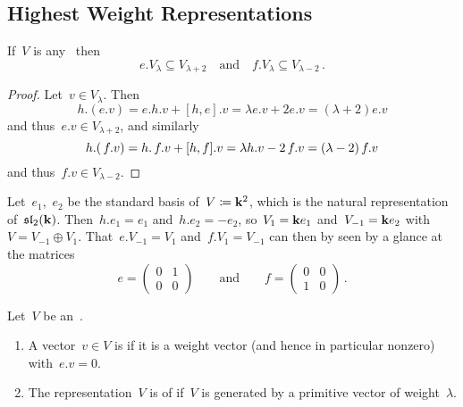 \subsection{Highest Weight Representations}


\begin{lemma}
  \label{shifting lemma}
  If~$V$ is any~{} then
  \[
    e.V_\lambda \subseteq V_{\lambda+2}
    \quad\text{and}\quad
    f.V_\lambda \subseteq V_{\lambda-2} \,.
  \]
\end{lemma}


\begin{proof}
  Let~$v \in V_\lambda$.
  Then
  \[
    h.(e.v)
    =
    e.h.v + [h,e].v
    =
    \lambda e.v + 2e.v
    =
    (\lambda + 2) e.v
  \]
  and thus~$e.v \in V_{\lambda + 2}$, and similarly
  \[
    h.(\, f.v)
    =
    h . \, f . v + [h,f].v
    =
    \lambda h.v - 2 \, f.v
    =
    (\lambda - 2) \, f.v
  \]
  and thus~$f.v \in V_{\lambda - 2}$.
\end{proof}


\begin{example}
  \label{natural representation of sl2}
  Let~$e_1$,~$e_2$ be the standard basis of~$V \coloneqq \mathbf{k}^2$, which is the natural representation of~$\mathfrak{sl}_2(\mathbf{k})$.
  Then~$h.e_1 = e_1$ and~$h.e_2 = -e_2$, so~$V_1 = \mathbf{k} e_1$ and~$V_{-1} = \mathbf{k} e_2$ with~$V = V_{-1} \oplus V_1$.
  That~$e.V_{-1} = V_1$ and~$f.V_1 = V_{-1}$ can then by seen by a glance at the matrices
  \[
    e
    =
    \begin{pmatrix}
      0 & 1 \\
      0 & 0
    \end{pmatrix}
    \qquad\text{and}\qquad
    f
    =
    \begin{pmatrix}
      0 & 0 \\
      1 & 0
      \end{pmatrix} \,.
  \]
\end{example}


\begin{definition}
  Let~$V$ be an~{}.
  \begin{enumerate}
    \item
      A vector~$v \in V$ is  if it is a weight vector (and hence in particular nonzero) with~$e.v = 0$.
    \item
      The representation~$V$ is of  if~$V$ is generated by a primitive vector of weight~$\lambda$.
  \end{enumerate}
\end{definition}


